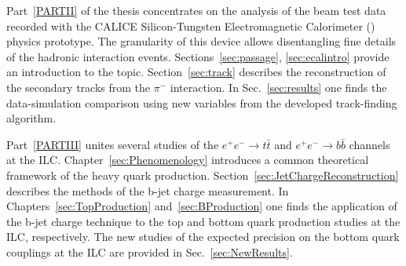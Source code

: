 Part~\ref{PARTII} of the thesis concentrates on the analysis of the beam test data recorded with the CALICE Silicon-Tungsten Electromagnetic Calorimeter (\ecal) physics prototype. The granularity of this device allows disentangling fine details of the hadronic interaction events. Sections~\ref{sec:passage}, \ref{sec:ecalintro} provide an introduction to the topic. Section~\ref{sec:track} describes the reconstruction of the secondary tracks from the $\pi^-$ interaction. 
In Sec.~\ref{sec:results} one finds the data-simulation comparison using new variables from the developed track-finding algorithm.

Part~\ref{PARTIII} unites several studies  of the $e^+e^- \to t\bar{t}$ and $e^+e^- \to b\bar{b}$ channels at the ILC.%
Chapter~\ref{sec:Phenomenology} introduces a common theoretical framework of the heavy quark production. Section~\ref{sec:JetChargeReconstruction} describes the methods of the b-jet charge measurement. In Chapters~\ref{sec:TopProduction} and~\ref{sec:BProduction} one finds the application of the b-jet charge technique to the top and bottom quark production studies at the ILC, respectively. The new studies of the expected precision on the bottom quark couplings at the ILC are provided in Sec.~\ref{sec:NewResults}. 











